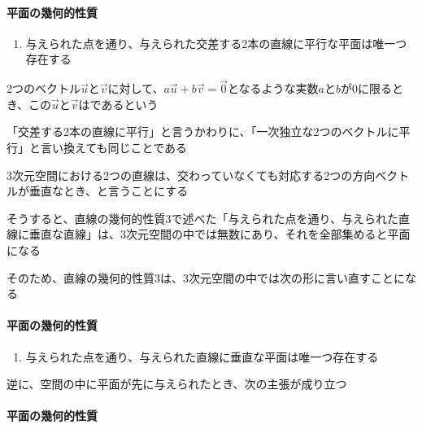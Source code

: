 \documentclass[../book_jiriki_calc]{subfiles}
\begin{document}
\br

\paragraph{平面の幾何的性質}

\begin{enumerate}[start=2]
  \item 与えられた点を通り、与えられた交差する2本の直線に平行な平面は唯一つ存在する
\end{enumerate}

\br

2つのベクトル$\overrightarrow{u}$と$\overrightarrow{v}$に対して、$a\overrightarrow{u}+b\overrightarrow{v}=\overrightarrow{0}$となるような実数$a$と$b$が$0$に限るとき、この$\overrightarrow{u}$と$\overrightarrow{v}$はであるという

\br

「交差する2本の直線に平行」と言うかわりに、「一次独立な2つのベクトルに平行」と言い換えても同じことである

\sectionline

3次元空間における2つの直線は、交わっていなくても対応する2つの方向ベクトルが垂直なとき、と言うことにする

\br

そうすると、直線の幾何的性質3で述べた「与えられた点を通り、与えられた直線に垂直な直線」は、3次元空間の中では無数にあり、それを全部集めると平面になる

そのため、直線の幾何的性質3は、3次元空間の中では次の形に言い直すことになる

\br

\paragraph{平面の幾何的性質}

\begin{enumerate}[start=3]
  \item 与えられた点を通り、与えられた直線に垂直な平面は唯一つ存在する
\end{enumerate}

\br

逆に、空間の中に平面が先に与えられたとき、次の主張が成り立つ

\br

\paragraph{平面の幾何的性質}
\end{document}
